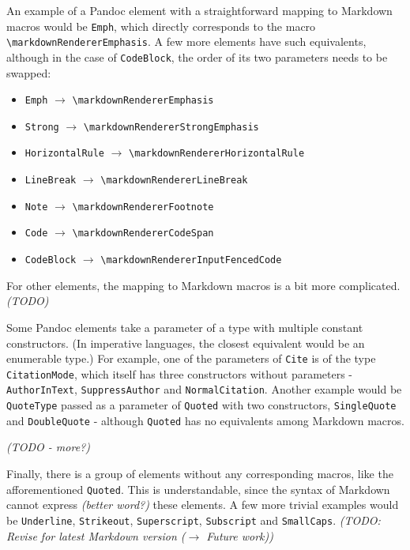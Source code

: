 \documentclass[
  digital,     %
  oneside,     %
  nosansbold,  %
  nocolorbold, %
  lof,         %
  lot,         %
]{fithesis4}
\newcommand{\renderer}[1]{\texttt{\textbackslash{}markdownRenderer{#1}}}
\begin{document}
An example of a Pandoc element with a straightforward mapping to Markdown macros would be \texttt{Emph}, which directly corresponds to the macro \renderer{Emphasis}. A few more elements have such equivalents, although in the case of \texttt{CodeBlock}, the order of its two parameters needs to be swapped:

\begin{itemize}
\item \texttt{Emph} $\rightarrow$ \renderer{Emphasis}
\item \texttt{Strong} $\rightarrow$ \renderer{StrongEmphasis}
\item \texttt{HorizontalRule} $\rightarrow$ \renderer{HorizontalRule}
\item \texttt{LineBreak} $\rightarrow$ \renderer{LineBreak}
\item \texttt{Note} $\rightarrow$ \renderer{Footnote}
\item \texttt{Code} $\rightarrow$ \renderer{CodeSpan}
\item \texttt{CodeBlock} $\rightarrow$ \renderer{InputFencedCode}
\end{itemize}

For other elements, the mapping to Markdown macros is a bit more complicated. \emph{(TODO)}

Some Pandoc elements take a parameter of a type with multiple constant constructors. (In imperative languages, the closest equivalent would be an enumerable type.) For example, one of the parameters of \texttt{Cite} is of the type \texttt{CitationMode}, which itself has three constructors without parameters - \texttt{AuthorInText}, \texttt{SuppressAuthor} and \texttt{NormalCitation}. Another example would be \texttt{QuoteType} passed as a parameter of \texttt{Quoted} with two constructors, \texttt{SingleQuote} and \texttt{DoubleQuote} - although \texttt{Quoted} has no equivalents among Markdown macros.

\emph{(TODO - more?)}

Finally, there is a group of elements without any corresponding macros, like the afforementioned \texttt{Quoted}. This is understandable, since the syntax of Markdown cannot express \emph{(better word?)} these elements. A few more trivial examples would be \texttt{Underline}, \texttt{Strikeout}, \texttt{Superscript}, \texttt{Subscript} and \texttt{SmallCaps}. \emph{(TODO: Revise for latest Markdown version ($\rightarrow$ Future work))}
\end{document}
